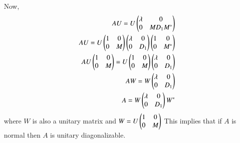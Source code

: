 \documentclass[journal,12pt,twocolumn]{IEEEtran}
\renewcommand\thesection{\arabic{section}}
\begin{document}
Now,
\begin{align}
AU = U \begin{pmatrix}\lambda & 0\\0 & M D_1 M^*\end{pmatrix}\\
AU = U \begin{pmatrix}1 & 0\\0 & M\end{pmatrix}\begin{pmatrix}\lambda & 0\\0 & D_1\end{pmatrix}\begin{pmatrix}1 & 0\\0 & M^*\end{pmatrix}\\
AU\begin{pmatrix}1 & 0\\0 & M\end{pmatrix} = U \begin{pmatrix}1 & 0\\0 & M\end{pmatrix}\begin{pmatrix}\lambda & 0\\0 & D_1\end{pmatrix}\\
AW = W\begin{pmatrix}\lambda & 0\\0 & D_1\end{pmatrix}\\
A = W\begin{pmatrix}\lambda & 0\\0 & D_1\end{pmatrix}W^*
\end{align}
where $W$ is also a unitary matrix and $W=U\begin{pmatrix}1 & 0\\0 & M\end{pmatrix}$
This implies that if $A$ is normal then $A$ is unitary diagonalizable.
%
\end{document}
